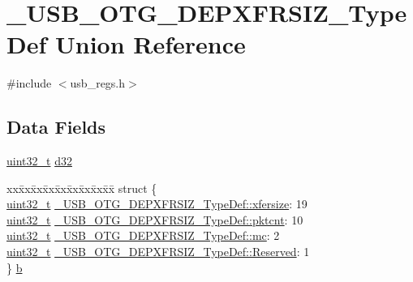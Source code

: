 \hypertarget{union___u_s_b___o_t_g___d_e_p_x_f_r_s_i_z___type_def}{\section{\-\_\-\-U\-S\-B\-\_\-\-O\-T\-G\-\_\-\-D\-E\-P\-X\-F\-R\-S\-I\-Z\-\_\-\-Type\-Def Union Reference}
\label{union___u_s_b___o_t_g___d_e_p_x_f_r_s_i_z___type_def}
}


{\ttfamily \#include $<$usb\-\_\-regs.\-h$>$}

\subsection*{Data Fields}
\begin{DoxyCompactItemize}
\item 
\hyperlink{stdint_8h_a435d1572bf3f880d55459d9805097f62}{uint32\-\_\-t} \hyperlink{group___u_s_b___o_t_g___d_r_i_v_e_r_gaf21925209991fac54719ba1172162a9e}{d32}
\item 
\begin{tabbing}
xx\=xx\=xx\=xx\=xx\=xx\=xx\=xx\=xx\=\kill
struct \{\\
\>\hyperlink{stdint_8h_a435d1572bf3f880d55459d9805097f62}{uint32\_t} \hyperlink{group___u_s_b___o_t_g___d_r_i_v_e_r_gacbb83610c76a02a5b5b6eb6660030456}{\_USB\_OTG\_DEPXFRSIZ\_TypeDef::xfersize}: 19\\
\>\hyperlink{stdint_8h_a435d1572bf3f880d55459d9805097f62}{uint32\_t} \hyperlink{group___u_s_b___o_t_g___d_r_i_v_e_r_ga77695bfee6d56fa56701a78625cf641f}{\_USB\_OTG\_DEPXFRSIZ\_TypeDef::pktcnt}: 10\\
\>\hyperlink{stdint_8h_a435d1572bf3f880d55459d9805097f62}{uint32\_t} \hyperlink{group___u_s_b___o_t_g___d_r_i_v_e_r_ga706f007f2762f307ff5971d15874422c}{\_USB\_OTG\_DEPXFRSIZ\_TypeDef::mc}: 2\\
\>\hyperlink{stdint_8h_a435d1572bf3f880d55459d9805097f62}{uint32\_t} \hyperlink{group___u_s_b___o_t_g___d_r_i_v_e_r_gae7b0cc98b67492a7d1b0b798e19b6eeb}{\_USB\_OTG\_DEPXFRSIZ\_TypeDef::Reserved}: 1\\
\} \hyperlink{group___u_s_b___o_t_g___d_r_i_v_e_r_ga786d5ef260b91be9f48665384921db3e}{b}\\

\end{tabbing}\end{DoxyCompactItemize}


